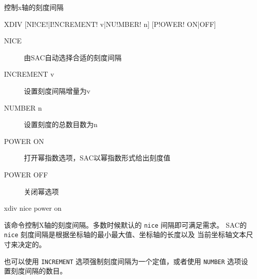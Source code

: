 \label{cmd:xdiv}

控制x轴的刻度间隔

\begin{SACSTX}
XDIV [NI!CE!|I!NCREMENT! v|NU!MBER! n] [P!OWER! ON|OFF]
\end{SACSTX}

\begin{description}
\item [NICE] 由SAC自动选择合适的刻度间隔
\item [INCREMENT v] 设置刻度间隔增量为v
\item [NUMBER n] 设置刻度的总数目数为n
\item [POWER ON] 打开幂指数选项，SAC以幂指数形式给出刻度值
\item [POWER OFF] 关闭幂选项
\end{description}

\begin{SACDFT}
xdiv nice power on
\end{SACDFT}

该命令控制X轴的刻度间隔。多数时候默认的 \texttt{nice} 间隔即可满足需求。
SAC的 \texttt{nice} 刻度间隔是根据坐标轴的最小最大值、坐标轴的长度以及
当前坐标轴文本尺寸来决定的。

也可以使用 \texttt{INCREMENT} 选项强制刻度间隔为一个定值，或者使用
\texttt{NUMBER} 选项设置刻度间隔的数目。
